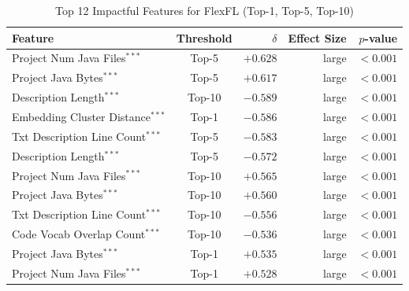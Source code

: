 \begin{table}[h]
\centering
\caption{Top 12 Impactful Features for FlexFL (Top-1, Top-5, Top-10)}
\label{tab:tool_features_flexfl_combined}
\begin{tabular}{lcrrr}
\toprule
Feature & Threshold & $\delta$ & Effect Size & $p$-value \\
\midrule
Project Num Java Files$^{***}$ & Top-5 & $+0.628$ & large & $<0.001$ \\
Project Java Bytes$^{***}$ & Top-5 & $+0.617$ & large & $<0.001$ \\
Description Length$^{***}$ & Top-10 & $-0.589$ & large & $<0.001$ \\
Embedding Cluster Distance$^{***}$ & Top-1 & $-0.586$ & large & $<0.001$ \\
Txt Description Line Count$^{***}$ & Top-5 & $-0.583$ & large & $<0.001$ \\
Description Length$^{***}$ & Top-5 & $-0.572$ & large & $<0.001$ \\
Project Num Java Files$^{***}$ & Top-10 & $+0.565$ & large & $<0.001$ \\
Project Java Bytes$^{***}$ & Top-10 & $+0.560$ & large & $<0.001$ \\
Txt Description Line Count$^{***}$ & Top-10 & $-0.556$ & large & $<0.001$ \\
Code Vocab Overlap Count$^{***}$ & Top-10 & $-0.536$ & large & $<0.001$ \\
Project Java Bytes$^{***}$ & Top-1 & $+0.535$ & large & $<0.001$ \\
Project Num Java Files$^{***}$ & Top-1 & $+0.528$ & large & $<0.001$ \\
\bottomrule
\end{tabular}
\end{table}

